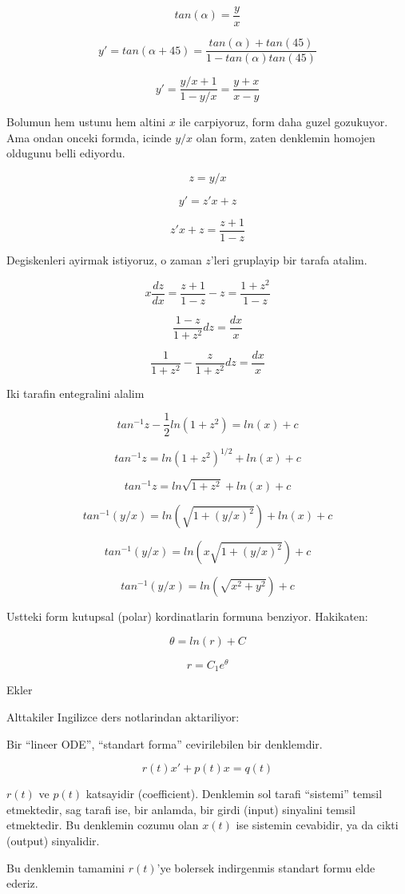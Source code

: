 \documentclass[12pt,fleqn]{article}
\begin{document}
\[ tan (\alpha) = \frac{y}{x} \]

\[ y' = tan(\alpha + 45) = \frac{tan(\alpha) + tan(45)}{1 - tan(\alpha)tan(45)} \]

\[ y' = \frac{y/x + 1}{1-y/x} =  \frac{y+x}{x-y} \]

Bolumun hem ustunu hem altini $x$ ile carpiyoruz, form daha guzel
gozukuyor. Ama ondan onceki formda, icinde $y/x$ olan form, zaten
denklemin homojen oldugunu belli ediyordu. 

\[ z = y/x \]

\[ y' = z'x + z \]

\[ z'x +z = \frac{z+1}{1-z} \]

Degiskenleri ayirmak istiyoruz, o zaman $z$'leri gruplayip bir tarafa
atalim. 

\[ x \frac{dz}{dx} = \frac{z+1}{1-z} - z = \frac{1+z^2}{1-z} \]

\[ \frac{1-z}{1+z^2}dz = \frac{dx}{x} \]

\[ \frac{1}{1+z^2} - \frac{z}{1+z^2} dz = \frac{dx}{x} \]


Iki tarafin entegralini alalim

\[ tan^{-1}z - \frac{1}{2} ln (1+z^2) = ln(x) + c \]

\[ tan^{-1}z = ln (1+z^2)^{1/2} + ln(x) + c \]

\[ tan^{-1}z = ln \sqrt{1+z^2} + ln(x) + c \]

\[ tan^{-1}(y/x) = ln (\sqrt{1+(y/x)^2}) + ln(x) + c \]

\[ tan^{-1}(y/x) = ln(x \sqrt{1+(y/x)^2}) + c \]

\[ tan^{-1}(y/x) = ln(\sqrt{x^2+y^2}) + c \]

Ustteki form kutupsal (polar) kordinatlarin formuna benziyor. Hakikaten:

\[ \theta = ln(r) + C \]

\[ r = C_1e^{\theta} \]

Ekler

Alttakiler Ingilizce ders notlarindan aktariliyor:

Bir ``lineer ODE'', ``standart forma'' cevirilebilen bir denklemdir.

\[ r(t)x' + p(t)x = q(t) \]

$r(t)$ ve $p(t)$ katsayidir (coefficient). Denklemin sol tarafi ``sistemi''
temsil etmektedir, sag tarafi ise, bir anlamda, bir girdi (input) sinyalini
temsil etmektedir. Bu denklemin cozumu olan $x(t)$ ise sistemin cevabidir,
ya da cikti (output) sinyalidir. 

Bu denklemin tamamini $r(t)$'ye bolersek indirgenmis standart formu elde
ederiz. 
\end{document}
